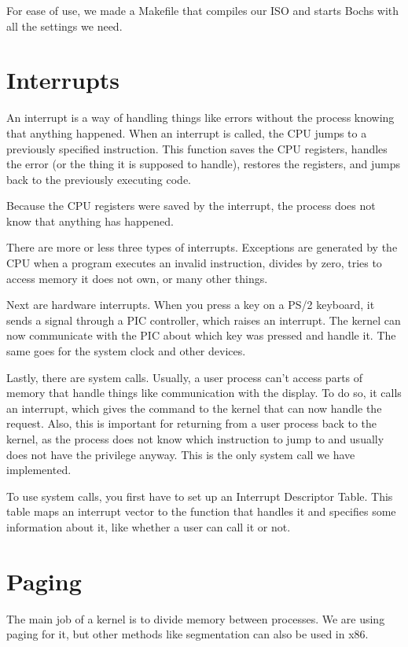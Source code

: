 \documentclass{article}
\begin{document}
For ease of use, we made a Makefile that compiles our ISO and starts Bochs with all the settings we need.

\section{Interrupts}
An interrupt is a way of handling things like errors without the process knowing that anything happened. When an interrupt is called, the CPU jumps to a previously specified instruction. This function saves the CPU registers, handles the error (or the thing it is supposed to handle), restores the registers, and jumps back to the previously executing code.

Because the CPU registers were saved by the interrupt, the process does not know that anything has happened.

There are more or less three types of interrupts. Exceptions are generated by the CPU when a program executes an invalid instruction, divides by zero, tries to access memory it does not own, or many other things.

Next are hardware interrupts. When you press a key on a PS/2 keyboard, it sends a signal through a PIC controller, which raises an interrupt. The kernel can now communicate with the PIC about which key was pressed and handle it. The same goes for the system clock and other devices.

Lastly, there are system calls. Usually, a user process can't access parts of memory that handle things like communication with the display. To do so, it calls an interrupt, which gives the command to the kernel that can now handle the request. Also, this is important for returning from a user process back to the kernel, as the process does not know which instruction to jump to and usually does not have the privilege anyway. This is the only system call we have implemented.

To use system calls, you first have to set up an Interrupt Descriptor Table. This table maps an interrupt vector to the function that handles it and specifies some information about it, like whether a user can call it or not.

\section{Paging}

The main job of a kernel is to divide memory between processes. We are using paging for it, but other methods like segmentation can also be used in x86.
\end{document}
